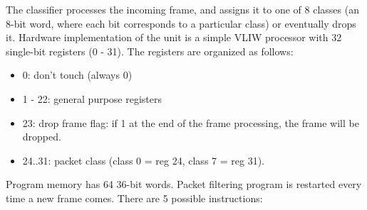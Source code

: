 The classifier processes the incoming frame, and assigns it to one of 8 classes
(an 8-bit word, where each bit corresponds to a particular class) or eventually
drops it. Hardware implementation of the unit is a simple VLIW processor with 32
single-bit registers (0 - 31). The registers are organized as follows:
\begin{itemize}
  \item 0: don't touch (always 0)
  \item 1 - 22: general purpose registers
  \item 23: drop frame flag: if 1 at the end of the frame processing, the frame will be dropped.
  \item 24..31: packet class (class 0 = reg 24, class 7 = reg 31).
\end{itemize}

Program memory has 64 36-bit words. Packet filtering program is restarted every
time a new frame comes.
There are 5 possible instructions:

